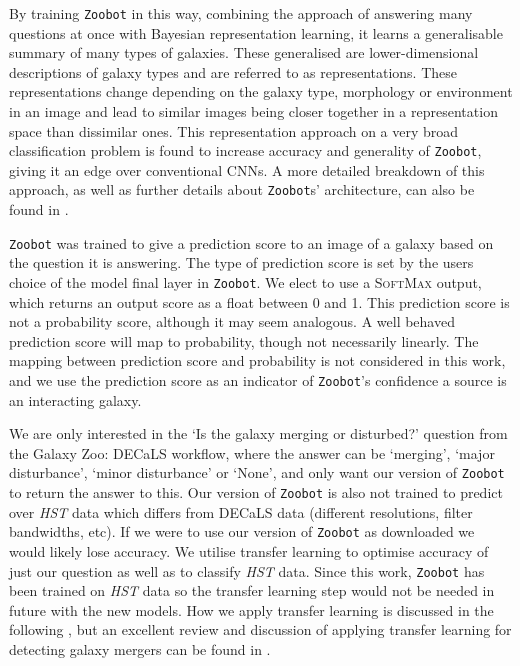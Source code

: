By training \texttt{Zoobot} in this way, combining the approach of answering many questions at once with Bayesian representation learning, it learns a generalisable summary of many types of galaxies. These generalised \DIFdelbegin {}\DIFdelend \DIFaddbegin {}\DIFaddend are lower-dimensional descriptions of galaxy types and are referred to as representations. These representations change depending on the galaxy type, morphology or environment in an image and lead to similar images being closer together in a representation space than dissimilar ones. This representation approach on a very broad classification problem is found to increase accuracy and generality of \texttt{Zoobot}, giving it an edge over conventional CNNs. A more detailed breakdown of this approach, as well as further details about \texttt{Zoobot}s' architecture, can also be found in \citet{2022MNRAS.509.3966W}.

\texttt{Zoobot} was trained to give a prediction score to an image of a galaxy based on the question it is answering. The type of prediction score is set by the users choice of the model final layer in \texttt{Zoobot}. We elect to use a \textsc{SoftMax} output, which returns an output score as a float between 0 and 1. This prediction score is not a probability score, although it may seem analogous. A well behaved prediction score will map to probability, though not necessarily linearly. The mapping between prediction score and probability is not considered in this work, and we use the prediction score as an indicator of \texttt{Zoobot}'s confidence a source is an interacting galaxy. 

We are only interested in the `Is the galaxy merging or disturbed?' question from the Galaxy Zoo: DECaLS workflow, where the answer can be `merging', `major disturbance', `minor disturbance' or `None', and only want our version of \texttt{Zoobot} to return the answer to this. Our version of \texttt{Zoobot} is also not trained to predict over \emph{HST} data which differs from DECaLS data (different resolutions, filter bandwidths, etc). If we were to use our version of \texttt{Zoobot} as downloaded we would likely lose accuracy. We utilise transfer learning to optimise accuracy of just our question as well as to classify \emph{HST} data. Since this work, \texttt{Zoobot} has been trained on \emph{HST} data so the transfer learning step would not be needed in future with the new models. How we apply transfer learning is discussed in the following \DIFdelbegin {}\DIFdelend \DIFaddbegin {}\DIFaddend , but an excellent review and discussion of applying transfer learning for detecting galaxy mergers can be found in \citet{2018MNRAS.479..415A}.

